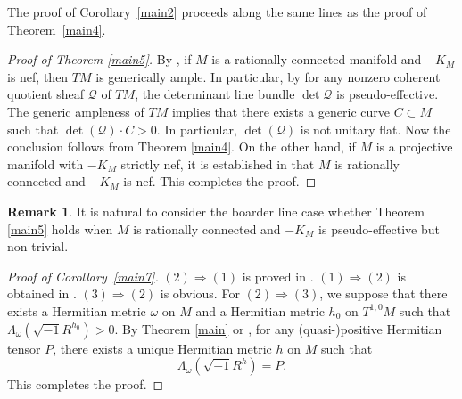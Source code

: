 \documentclass[12pt, reqno]{amsart}
\newcommand\cQ{{\mathcal Q}}
\theoremstyle{plain}
\theoremstyle{definition}
\newtheorem{remark}[thm]{Remark}
\newcommand{\bproof}{\begin{proof}}
\newcommand{\eproof}{\end{proof}}
\newcommand{\bremark}{\begin{remark}}
\newcommand{\eremark}{\end{remark}}
\newcommand{\sq}{\sqrt{-1}}
\newcommand{\beq}{\begin{equation}}
\newcommand{\eeq}{\end{equation}}
\renewcommand{\>}{\rightarrow}
\renewcommand{\>}{\rightarrow}
\numberwithin{equation}{section} %
\begin{document}
\noindent The proof of Corollary~\ref{main2} proceeds along the same lines as the proof of Theorem~\ref{main4}.

\bproof[Proof of Theorem \ref{main5}] By \cite[Theorem~1.7]{Ou23},  if  $M$ is  a rationally connected  manifold and $-K_M$ is nef, then $TM$ is generically ample. In particular, by \cite[Theorem~1.4]{Ou23}  for any nonzero coherent quotient sheaf $\cQ$ of $TM$, the determinant line bundle $\det\cQ$ is pseudo-effective. The generic ampleness of $TM$ implies that there exists a generic curve $C\subset M$ such that $\det(\cQ)\cdot C>0$.  In particular,  $\det(\cQ)$ is  not unitary flat. Now the conclusion follows from Theorem \ref{main4}. On the other hand, if $M$ is a projective manifold with $-K_M$ strictly nef, it is established in \cite[Theorem~1.2]{LOY19} that $M$ is rationally connected and $-K_M$ is nef. This completes the proof.
\eproof 

\bremark It is natural to consider the boarder line case whether Theorem \ref{main5} holds when $M$ is rationally connected and $-K_M$ is pseudo-effective but non-trivial.
\eremark 

\bproof[Proof of Corollary~\ref{main7}] $(2)\Longrightarrow(1)$ is proved in \cite[Corollary~1.5]{Yang18}.  $(1)\Longrightarrow(2)$ is obtained in \cite[Theorem~1.7]{LZZ25}.  $(3)\Longrightarrow(2)$ is obvious. For $(2)\Longrightarrow(3)$, we suppose that  there exists a Hermitian metric $\omega$ on $M$ and a Hermitian metric  $h_0$ on $T^{1,0}M$ such that 
$ \Lambda_\omega\left(\sq R^{h_0}\right)>0$. 
By Theorem \ref{main} or \cite[Theorem~1.2]{XYY26+}, for any (quasi-)positive Hermitian tensor  $P$, there exists a unique Hermitian metric $h$ on $M$ such that 
\beq \Lambda_\omega\left(\sq R^{h}\right)=P. \eeq 
This completes the proof.
\eproof 
\end{document}
